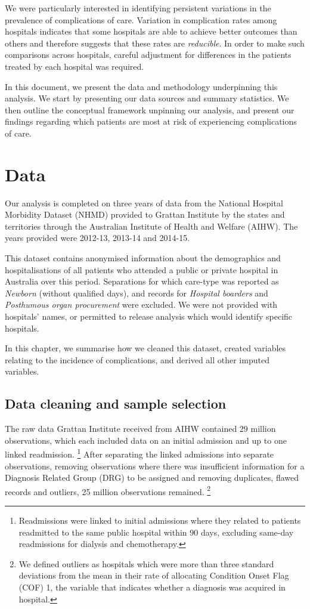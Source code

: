 \documentclass[submission]{grattan}
\begin{document}
We were particularly interested in identifying persistent variations in the prevalence of complications of care.
Variation in complication rates among hospitals indicates that some hospitals are able to achieve better outcomes than others and therefore suggests that these rates are \emph{reducible}.
In order to make such comparisons across hospitals, careful adjustment for differences in the patients treated by each hospital was required.

In this document, we present the data and methodology underpinning this analysis.
We start by presenting our data sources and summary statistics.
We then outline the conceptual framework unpinning our analysis, and present our findings regarding which patients are most at risk of experiencing complications of care.

\chapter{Data}\label{chap:data}

Our analysis is completed on three years of data from the National Hospital Morbidity Dataset (NHMD) provided to Grattan Institute by the states and territories through the Australian Institute of Health and Welfare (AIHW).
The years provided were 2012-13, 2013-14 and 2014-15.

This dataset contains anonymised information about the demographics and hospitalisations of all patients who attended a public or private hospital in Australia over this period.
Separations for which care-type was reported as \emph{Newborn} (without qualified days), and records for \emph{Hospital boarders} and \emph{Posthumous organ procurement} were excluded.
We were not provided with hospitals' names, or permitted to release analysis which would identify specific hospitals.

In this chapter, we summarise how we cleaned this dataset, created variables relating to the incidence of complications, and derived all other imputed variables.

\section{Data cleaning and sample selection}\label{sec:data-cleaning-and-sample-selection}

The raw data Grattan Institute received from AIHW contained 29 million observations, which each included data on an initial admission and up to one linked readmission.%
	\footnote{Readmissions were linked to initial admissions where they related to patients readmitted to the same public hospital within 90 days, excluding same-day readmissions for dialysis and chemotherapy.}
After separating the linked admissions into separate observations, removing observations where there was insufficient information for a Diagnosis Related Group (DRG) to be assigned and removing duplicates, flawed records and outliers, 25 million observations remained.%
	\footnote{We defined outliers as hospitals which were more than three standard deviations from the mean in their rate of allocating Condition Onset Flag (COF) 1, the variable that indicates whether a diagnosis was acquired in hospital.}
\end{document}
